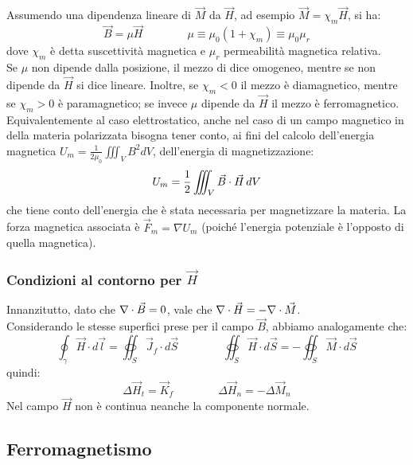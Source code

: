 %
Assumendo una dipendenza lineare di $ \vec{M} $ da $ \vec{H} $, ad esempio $ \vec{M} = \chi_m \vec{H} $, si ha:
\begin{equation}
	\vec{B} = \mu\vec{H} \qquad\qquad \mu \equiv \mu_0 (1 + \chi_m) \equiv \mu_0 \mu_r
	\label{eq:24}
\end{equation}
dove $ \chi_m $ è detta suscettività magnetica e $ \mu_r $ permeabilità magnetica relativa. \\ 
%
Se $ \mu $ non dipende dalla posizione, il mezzo di dice omogeneo, mentre se non dipende da $ \vec{H} $ si dice lineare. Inoltre, se $ \chi_m < 0 $ il mezzo è diamagnetico, mentre se $ \chi_m > 0 $ è paramagnetico; se invece $ \mu $ dipende da $ \vec{H} $ il mezzo è ferromagnetico. \\ 
Equivalentemente al caso elettrostatico, anche nel caso di un campo magnetico in della materia polarizzata bisogna tener conto, ai fini del calcolo dell'energia magnetica $ U_m = \frac{1}{2\mu_0}\iiint_V B^2 dV $, dell'energia di magnetizzazione:
\begin{equation}
	U_m = \frac{1}{2} \iiint_V \vec{B}\cdot\vec{H} \,dV
	\label{eq:25}
\end{equation}
che tiene conto dell'energia che è stata necessaria per magnetizzare la materia. La forza magnetica associata è $ \vec{F}_m = \nabla U_m $ (poiché l'energia potenziale è l'opposto di quella magnetica).

\subsubsection{Condizioni al contorno per $ \vec{H} $}

Innanzitutto, dato che $ \nabla\cdot\vec{B} = 0 $, vale che $ \nabla\cdot\vec{H} = -\nabla\cdot\vec{M} $. \\ 
%
Considerando le stesse superfici prese per il campo $ \vec{B} $, abbiamo analogamente che:
\begin{equation}
	\oint_{\gamma} \vec{H} \cdot d\vec{l} = \oiint_S \vec{J}_f \cdot d\vec{S} \qquad\qquad \oiint_S \vec{H}\cdot d\vec{S} =	- \oiint_S \vec{M}\cdot d\vec{S}
	\label{eq:26}
\end{equation}
quindi:
\begin{equation}
	\Delta\vec{H}_t = \vec{K}_f \qquad\qquad \Delta\vec{H}_n = - \Delta\vec{M}_n
	\label{eq:27}
\end{equation}
Nel campo $ \vec{H} $ non è continua neanche la componente normale.

\subsection{Ferromagnetismo}

